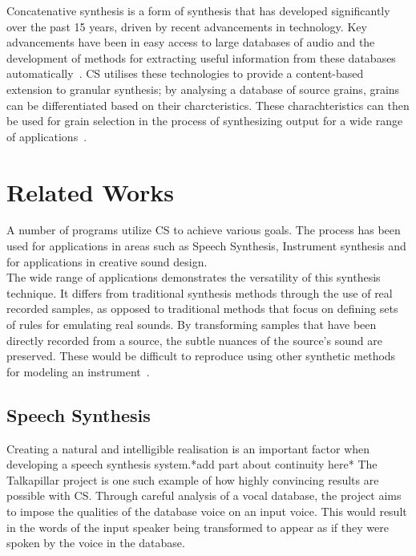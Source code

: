 \documentclass{scrartcl}
\begin{document}
    Concatenative synthesis is a form of synthesis that has developed
    significantly over the past 15 years, driven by recent advancements in
    technology. Key advancements have been in easy access to large databases of
    audio and the development of methods for extracting useful information from
    these databases automatically~\parencite[p.1]{Schwarz2006a}.  CS utilises
    these technologies to provide a content-based extension to granular
    synthesis; by analysing a database of source grains, grains can be
    differentiated based on their charcteristics.  These charachteristics can
    then be used for grain selection in the process of synthesizing output for
    a wide range of applications~\parencite[p.102]{Schwarz2007}.

    \section*{Related Works}
    A number of programs utilize CS to achieve various goals. The process has
    been used for applications in areas such as Speech Synthesis, Instrument
    synthesis and for applications in creative sound design.\\
    The wide range of applications demonstrates the versatility of this
    synthesis technique. It differs from traditional synthesis methods through
    the use of real recorded samples, as opposed to traditional methods that
    focus on defining sets of rules for emulating real sounds. By transforming
    samples that have been directly recorded from a source, the subtle nuances
    of the source's sound are preserved. These would be difficult to reproduce
    using other synthetic methods for modeling an
    instrument~\parencite[p.24]{Maestre2009}.

    \subsection*{Speech Synthesis}
    Creating a natural and intelligible realisation is an important factor when
    developing a speech synthesis system.*add part about continuity here* The
    Talkapillar project is one such example of how highly convincing results
    are possible with CS. Through careful analysis of a vocal database, the
    project aims to impose the qualities of the database voice on an input
    voice. This would result in the words of the input speaker being
    transformed to appear as if they were spoken by the voice in the
    database.~\parencite{Hueber}
    
\end{document}
